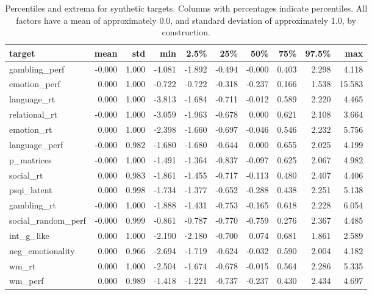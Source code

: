 \documentclass{article}
\begin{document}
\begin{table}
\centering
\begin{tabular}{lrrrrrrrrr}
	\toprule
	target & mean & std & min & 2.5\% & 25\% & 50\% & 75\% & 97.5\% & max \\
	\midrule
	gambling\_perf       & -0.000 & 1.000 & -4.081 & -1.892 & -0.494 & -0.000 & 0.403 & 2.298 & 4.118 \\
	emotion\_perf        &  0.000 & 1.000 & -0.722 & -0.722 & -0.318 & -0.237 & 0.166 & 1.538 & 15.583\\
	language\_rt         &  0.000 & 1.000 & -3.813 & -1.684 & -0.711 & -0.012 & 0.589 & 2.220 & 4.465 \\
	relational\_rt       & -0.000 & 1.000 & -3.059 & -1.963 & -0.678 &  0.000 & 0.621 & 2.108 & 3.664 \\
	emotion\_rt          &  0.000 & 1.000 & -2.398 & -1.660 & -0.697 & -0.046 & 0.546 & 2.232 & 5.756 \\
	language\_perf       & -0.000 & 0.982 & -1.680 & -1.680 & -0.644 &  0.000 & 0.655 & 2.025 & 4.199 \\
	p\_matrices          & -0.000 & 1.000 & -1.491 & -1.364 & -0.837 & -0.097 & 0.625 & 2.067 & 4.982 \\
	social\_rt           &  0.000 & 0.983 & -1.861 & -1.455 & -0.717 & -0.113 & 0.480 & 2.407 & 4.406 \\
	psqi\_latent         &  0.000 & 0.998 & -1.734 & -1.377 & -0.652 & -0.288 & 0.438 & 2.251 & 5.138 \\
	gambling\_rt         & -0.000 & 1.000 & -1.888 & -1.431 & -0.753 & -0.165 & 0.618 & 2.228 & 6.054 \\
	social\_random\_perf & -0.000 & 0.999 & -0.861 & -0.787 & -0.770 & -0.759 & 0.276 & 2.367 & 4.485 \\
	int\_g\_like         &  0.000 & 1.000 & -2.190 & -2.180 & -0.700 &  0.074 & 0.681 & 1.861 & 2.589 \\
	neg\_emotionality    &  0.000 & 0.966 & -2.694 & -1.719 & -0.624 & -0.032 & 0.590 & 2.004 & 4.182 \\
	wm\_rt               &  0.000 & 1.000 & -2.504 & -1.674 & -0.678 & -0.015 & 0.564 & 2.286 & 5.335 \\
	wm\_perf             &  0.000 & 0.989 & -1.418 & -1.221 & -0.737 & -0.237 & 0.430 & 2.434 & 4.697 \\
	\bottomrule
\end{tabular}
\label{tab:target-stats}
\footnotesize
\caption{Percentiles and extrema for synthetic targets. Columns with percentages
indicate percentiles. All factors have a mean of approximately 0.0, and
standard deviation of approximately 1.0, by construction.}
\normalsize
\end{table}
\end{document}

